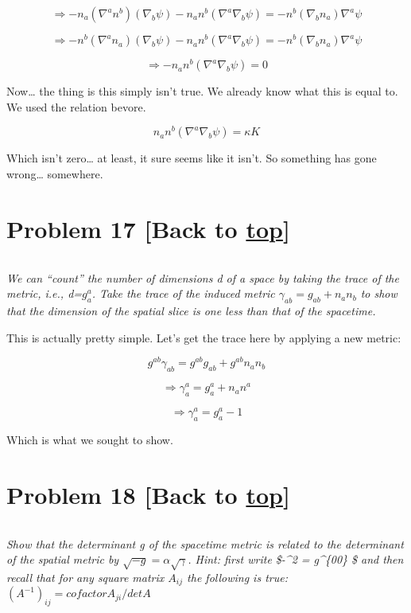 \documentclass[landscape,letterpaper,10pt,english]{article}
\begin{document}
\[ \Rightarrow -n_a (\nabla^a n^b)(\nabla_b \psi) -n_a n^b (\nabla^a\nabla_b \psi) = - n^b (\nabla_b n_a) \nabla^a \psi\]

\[ \Rightarrow -n^b (\nabla^a n_a)(\nabla_b \psi) -n_a n^b (\nabla^a\nabla_b \psi) = - n^b (\nabla_b n_a) \nabla^a \psi\]

\[ \Rightarrow  -n_a n^b (\nabla^a\nabla_b \psi) = 0\]

    Now\ldots{} the thing is this simply isn't true. We already know what
this is equal to. We used the relation bevore.

\[ n_a n^b (\nabla^a\nabla_b \psi) = \kappa K\]

Which isn't zero\ldots{} at least, it sure seems like it isn't. So
something has gone wrong\ldots{} somewhere.

    \hypertarget{problem-17-back-to-top}{%
\section{\texorpdfstring{Problem 17 {[}Back to
\hyperref[toc]{top}{]}}{Problem 17 {[}Back to {]}}}\label{problem-17-back-to-top}}

\[\label{P17}\]

\emph{We can ``count'' the number of dimensions d of a space by taking
the trace of the metric, i.e., d=\(g^a_a\). Take the trace of the
induced metric \(\gamma_{ab} = g_{ab} + n_a n_b\) to show that the
dimension of the spatial slice is one less than that of the spacetime.}

This is actually pretty simple. Let's get the trace here by applying a
new metric:

\[g^{ab}\gamma_{ab} = g^{ab}g_{ab} + g^{ab}n_a n_b\]

\[ \Rightarrow \gamma^a_a= g^a_a + n_a n^a\]

\[ \Rightarrow \gamma^a_a= g^a_a -1\]

Which is what we sought to show.

    \hypertarget{problem-18-back-to-top}{%
\section{\texorpdfstring{Problem 18 {[}Back to
\hyperref[toc]{top}{]}}{Problem 18 {[}Back to {]}}}\label{problem-18-back-to-top}}

\[\label{P18}\]

\emph{Show that the determinant g of the spacetime metric is related to
the determinant of the spatial metric by
\(\sqrt{-g} = \alpha \sqrt{\gamma}\). Hint: first write \$-\alpha\^{}2 =
g\^{}\{00\} \$ and then recall that for any square matrix \(A_{ij}\) the
following is true: \((A^{-1})_{ij} = cofactorA_{ji}/detA\)}
\end{document}
